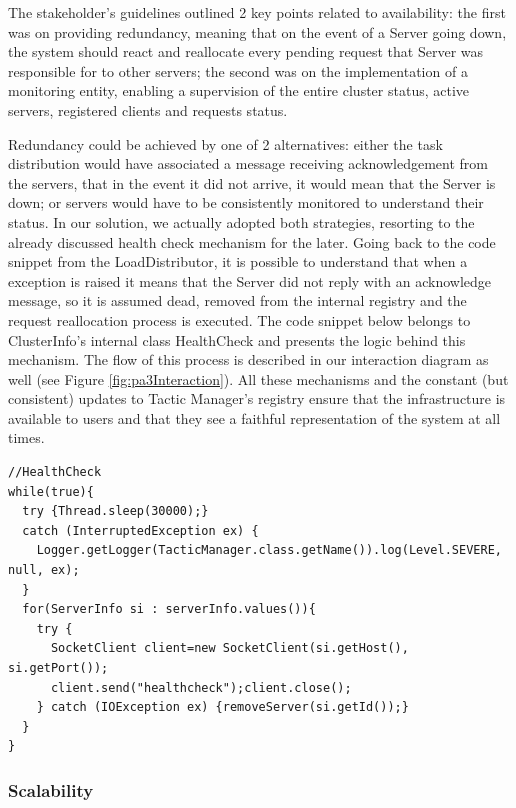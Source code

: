 \documentclass[12pt]{article}
\begin{document}
The stakeholder's guidelines outlined 2 key points related to availability:
the first was on providing redundancy, meaning that on the event of a Server going down, the system should react and reallocate every pending request that Server
was responsible for to other servers;
the second was on the implementation of a monitoring entity, enabling a supervision of the entire cluster status, active servers, registered clients and requests status.

Redundancy could be achieved by one of 2 alternatives: 
either the task distribution would have associated a message receiving acknowledgement from the servers, that in the event it did not arrive, it would mean that 
the Server is down;
or servers would have to be consistently monitored to understand their status.
In our solution, we actually adopted both strategies, resorting to the already discussed health check mechanism for the later.
Going back to the code snippet from the LoadDistributor, it is possible to understand that when a exception is raised it means that the Server did not reply
with an acknowledge message, so it is assumed dead, removed from the internal registry and the request reallocation process is executed.
The code snippet below belongs to ClusterInfo's internal class HealthCheck and presents the logic behind this mechanism.
The flow of this process is described in our interaction diagram as well (see Figure \ref{fig:pa3Interaction}).
All these mechanisms and the constant (but consistent) updates to Tactic Manager's registry ensure that the infrastructure is available to users and that they 
see a faithful representation of the system at all times.

\begin{lstlisting}
//HealthCheck
while(true){
  try {Thread.sleep(30000);}
  catch (InterruptedException ex) {
    Logger.getLogger(TacticManager.class.getName()).log(Level.SEVERE, null, ex);
  }
  for(ServerInfo si : serverInfo.values()){
    try {
      SocketClient client=new SocketClient(si.getHost(), si.getPort());
      client.send("healthcheck");client.close();
    } catch (IOException ex) {removeServer(si.getId());}
  }
}
\end{lstlisting}

\subsubsection{Scalability} \label{scalability}
\end{document}
